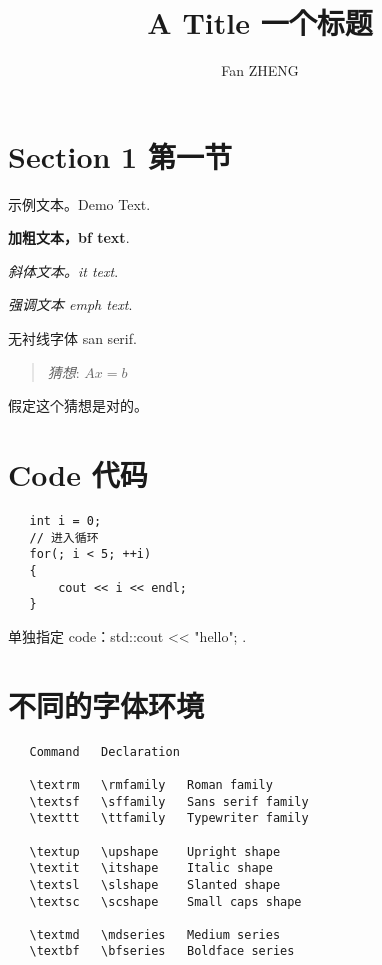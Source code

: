 \documentclass[]{article}
\begin{document}
\title{A Title 一个标题}
\author{Fan ZHENG}
\maketitle

\section{Section 1 第一节}

示例文本。Demo Text.

\textbf{加粗文本，bf text}. 

\textit{斜体文本。it text}. 

\emph{强调文本 emph text}. 

\textsf{无衬线字体 san serif}.

\begin{quotation}
    \textit{猜想}: $Ax = b$
\end{quotation}

假定这个猜想是对的。

\section{Code 代码}
\begin{verbatim}
   int i = 0;
   // 进入循环
   for(; i < 5; ++i)
   {
       cout << i << endl;
   }
\end{verbatim}

单独指定 code：{\code std::cout << "hello"; }.

\section{不同的字体环境}

\begin{verbatim}
   Command   Declaration
    
   \textrm   \rmfamily   Roman family
   \textsf   \sffamily   Sans serif family
   \texttt   \ttfamily   Typewriter family
    
   \textup   \upshape    Upright shape
   \textit   \itshape    Italic shape
   \textsl   \slshape    Slanted shape
   \textsc   \scshape    Small caps shape
    
   \textmd   \mdseries   Medium series
   \textbf   \bfseries   Boldface series
\end{verbatim}
\end{document}

